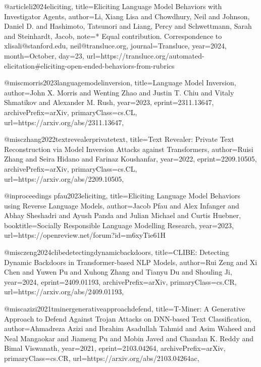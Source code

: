 @article{li2024eliciting,
  title={Eliciting Language Model Behaviors with Investigator Agents},
  author={Li, Xiang Lisa and Chowdhury, Neil and Johnson, Daniel D. and Hashimoto, Tatsunori and Liang, Percy and Schwettmann, Sarah and Steinhardt, Jacob},
  note={* Equal contribution. Correspondence to xlisali@stanford.edu, neil@transluce.org},
  journal={Transluce},
  year={2024},
  month={October},
  day={23},
  url={https://transluce.org/automated-elicitation#eliciting-open-ended-behaviors-from-rubrics}
}

@misc{morris2023languagemodelinversion,
      title={Language Model Inversion}, 
      author={John X. Morris and Wenting Zhao and Justin T. Chiu and Vitaly Shmatikov and Alexander M. Rush},
      year={2023},
      eprint={2311.13647},
      archivePrefix={arXiv},
      primaryClass={cs.CL},
      url={https://arxiv.org/abs/2311.13647}, 
}

@misc{zhang2022textrevealerprivatetext,
      title={Text Revealer: Private Text Reconstruction via Model Inversion Attacks against Transformers}, 
      author={Ruisi Zhang and Seira Hidano and Farinaz Koushanfar},
      year={2022},
      eprint={2209.10505},
      archivePrefix={arXiv},
      primaryClass={cs.CL},
      url={https://arxiv.org/abs/2209.10505}, 
}

@inproceedings{
pfau2023eliciting,
title={Eliciting Language Model Behaviors using Reverse Language Models},
author={Jacob Pfau and Alex Infanger and Abhay Sheshadri and Ayush Panda and Julian Michael and Curtis Huebner},
booktitle={Socially Responsible Language Modelling Research},
year={2023},
url={https://openreview.net/forum?id=m6xyTie61H}
}

@misc{zeng2024clibedetectingdynamicbackdoors,
      title={CLIBE: Detecting Dynamic Backdoors in Transformer-based NLP Models}, 
      author={Rui Zeng and Xi Chen and Yuwen Pu and Xuhong Zhang and Tianyu Du and Shouling Ji},
      year={2024},
      eprint={2409.01193},
      archivePrefix={arXiv},
      primaryClass={cs.CR},
      url={https://arxiv.org/abs/2409.01193}, 
}

@misc{azizi2021tminergenerativeapproachdefend,
      title={T-Miner: A Generative Approach to Defend Against Trojan Attacks on DNN-based Text Classification}, 
      author={Ahmadreza Azizi and Ibrahim Asadullah Tahmid and Asim Waheed and Neal Mangaokar and Jiameng Pu and Mobin Javed and Chandan K. Reddy and Bimal Viswanath},
      year={2021},
      eprint={2103.04264},
      archivePrefix={arXiv},
      primaryClass={cs.CR},
      url={https://arxiv.org/abs/2103.04264}ac, 
}

